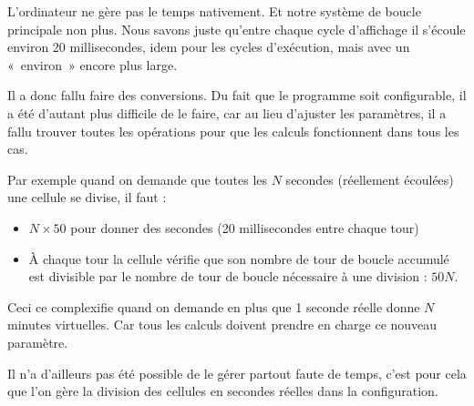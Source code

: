 L'ordinateur ne gère pas le temps nativement. Et notre système de boucle principale non plus.
Nous savons juste qu'entre chaque cycle d'affichage il s'écoule environ 20 millisecondes, idem pour les cycles d'exécution, mais avec un «~environ~» encore plus large.
  
Il a donc fallu faire des conversions. Du fait que le programme soit configurable, il a été d'autant plus difficile de le faire, car au lieu d'ajuster les paramètres, il a fallu trouver toutes les opérations pour que les calculs fonctionnent dans tous les cas.

Par exemple quand on demande que toutes les $N$ secondes (réellement écoulées) une cellule se divise, il faut :
  \begin{itemize}
    \item $N \times 50$ pour donner des secondes (20 millisecondes entre chaque tour)
    \item À chaque tour la cellule vérifie que son nombre de tour de boucle accumulé est divisible par 
le nombre de tour de boucle nécessaire à une division : $50N$.
  \end{itemize}
  
Ceci ce complexifie quand on demande en plus que 1 seconde réelle donne $N$ minutes virtuelles.
Car tous les calculs doivent prendre en charge ce nouveau paramètre.

Il n'a d'ailleurs pas été possible de le gérer partout faute de temps, c'est pour cela que l'on gère la division des cellules en secondes réelles dans la configuration.


